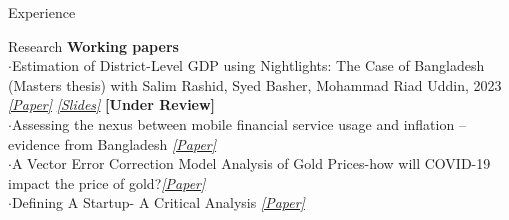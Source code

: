 \documentclass[
	9pt, %
]{resume} %
\begin{document}
\begin{rSection}{Experience}
\begin{rSection}{Research}
	\vspace{-6pt}
	\textbf{Working papers} \\
	$\cdot$Estimation of District-Level GDP using Nightlights: The Case of Bangladesh (Masters thesis) with Salim Rashid, Syed Basher, Mohammad Riad Uddin, 2023   \textit{\href{https://papers.ssrn.com/sol3/papers.cfm?abstract_id=4373887}{[Paper]}} \textit{\href{https://drive.google.com/file/d/1Fcz9kcQH-0bsl6-8REYTjoXooL8vKHHT/view}{[Slides]}} \textbf{[Under Review] }\\
	$\cdot$Assessing the nexus between mobile financial service usage and inflation – evidence from Bangladesh  \textit{\href{https://www.researchgate.net/publication/356159753_Assessing_the_nexus_between_mobile_financial_service_usage_and_inflation_-_evidence_from_Bangladesh}{[Paper]}} \\
	$\cdot$A Vector Error Correction Model Analysis of Gold Prices-how will COVID-19 impact the price of gold?\textit{\href{https://papers.ssrn.com/sol3/papers.cfm?abstract_id=3644893}{[Paper]}}  \\
	$\cdot$Defining A Startup- A Critical Analysis \textit{\href{https://papers.ssrn.com/sol3/papers.cfm?abstract_id=3823361}{[Paper]}} \\

		
\end{rSection}


\end{rSection}
\end{document}
